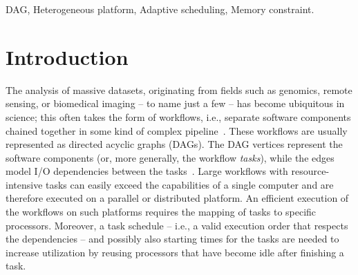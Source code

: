 \documentclass[conference]{IEEEtran}
\newcommand{\new}[1]{{\color{blue}#1}}
\newcommand{\skug}[1]{{\color{blue}[SK: #1]}}
\renewcommand{\iec}{i.e., }
\begin{document}
\begin{abstract}

\end{abstract}

    \begin{IEEEkeywords}
        DAG, Heterogeneous platform, Adaptive scheduling, Memory constraint.
    \end{IEEEkeywords}

\section{Introduction} %

The analysis of massive datasets, originating from fields such as genomics, 
remote sensing, or biomedical imaging -- to name just a few -- has become ubiquitous in science;
this often takes the form of workflows, \iec separate software components chained together
in some kind of complex pipeline~\cite{DBLP:journals/dbsk/LeserHDEGHKKKKK21}.
These workflows are usually represented as directed acyclic graphs (DAGs).
The DAG vertices represent the software components (or, more generally, the workflow \emph{tasks}),
while the edges model I/O dependencies between the tasks~\cite{adhikari2019survey,liu2018survey}.
Large workflows with resource-intensive tasks can easily exceed the capabilities of a 
single computer and are therefore executed on a parallel or distributed platform.
An efficient execution of the workflows on such platforms requires the mapping of tasks
to specific processors.
\new{Moreover, a task schedule -- \iec a valid execution order that respects the dependencies --
and possibly also starting times for the tasks are needed to increase utilization by reusing 
processors that have become idle after finishing a task.}
\end{document}
